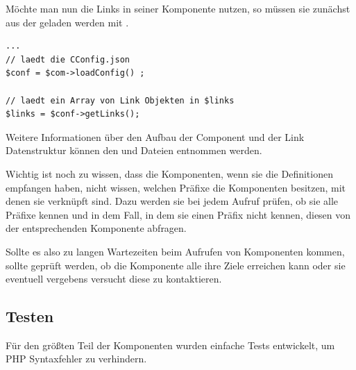 Möchte man nun die Links in seiner Komponente nutzen, so müssen sie zunächst aus der  geladen werden mit .

\begin{minipage}{\textwidth}
\begin{lstlisting}
...
// laedt die CConfig.json
$conf = $com->loadConfig() ;

// laedt ein Array von Link Objekten in $links
$links = $conf->getLinks(); 
\end{lstlisting}
\end{minipage}

Weitere Informationen über den Aufbau der Component und der Link Datenstruktur können den  und  Dateien entnommen werden.

Wichtig ist noch zu wissen, dass die Komponenten, wenn sie die Definitionen empfangen haben, nicht wissen, welchen Präfixe die Komponenten besitzen, mit denen sie verknüpft sind. Dazu werden sie bei jedem Aufruf prüfen, ob sie alle Präfixe kennen und in dem Fall, in dem sie einen Präfix nicht kennen, diesen von der entsprechenden Komponente abfragen.

Sollte es also zu langen Wartezeiten beim Aufrufen von Komponenten kommen, sollte geprüft werden, ob die Komponente alle ihre Ziele erreichen kann oder sie eventuell vergebens versucht diese zu kontaktieren.

 \subsection{Testen}
 Für den größten Teil der Komponenten wurden einfache Tests entwickelt, um PHP Syntaxfehler zu verhindern. 
 
